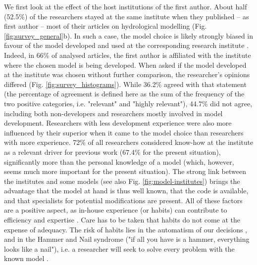 \documentclass[10pt,a4paper]{article}
\begin{document}
We first look at the effect of the host institutions of the first author. About half (52.5\%) of the researchers stayed at the same institute when they published -- as first author -- most of their articles on hydrological modelling (Fig. \ref{fig:survey_general}b). In such a case, the model choice is likely strongly biased in favour of the model developed and used at the corresponding research institute \citep{Addor2019}. Indeed, in 66\% of analysed articles, the first author is affiliated with the institute where the chosen model is being developed. When asked if the model developed at the institute was chosen without further comparison, the researcher's opinions differed (Fig. \ref{fig:survey_histograms}). While 36.2\% agreed with that statement (the percentage of agreement is defined here as the sum of the frequency of the two positive categories, i.e. "relevant" and "highly relevant"),  44.7\% did not agree, including both non-developers and researchers mostly involved in model development. Researchers with less development experience were also more influenced by their superior when it came to the model choice than researchers with more experience. 72\% of all researchers considered know-how at the institute as a relevant driver for previous work (67.4\% for the present situation), significantly more than the personal knowledge of a model (which, however, seems much more important for the present situation). The strong link between the institutes and some models (see also Fig. \ref{fig:model-institutes}) brings the advantage that the model at hand is thus well known, that the code is available, and that specialists for potential modifications are present. All of these factors are a positive aspect, as in-house experience (or habits) can contribute to efficiency and expertise \citep{Babel2019}. Care has to be taken that habits do not come at the expense of adequacy. The risk of habits lies in the automatism of our decisions \citep{Babel2019}, and in the Hammer and Nail syndrome ("if all you have is a hammer, everything looks like a nail"), i.e. a researcher will seek to solve every problem with the known model \citep{Hamalainen2015}.
\end{document}
